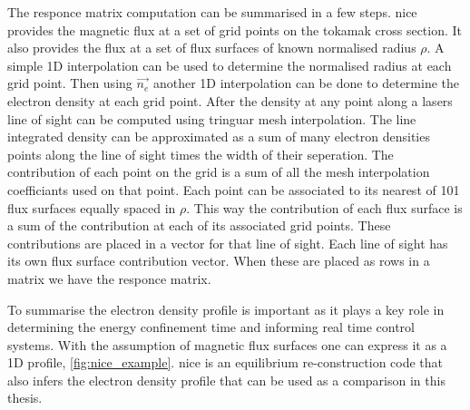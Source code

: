 The responce matrix computation can be summarised in a few steps. \Gls{nice} provides the magnetic flux at a set of grid points on the tokamak cross section. It also provides the flux at a set of flux surfaces of known normalised radius $\rho$. A simple 1D interpolation can be used to determine the normalised radius at each grid point. Then using $\Vec{n_e}$ another 1D interpolation can be done to determine the electron density at each grid point. After the density at any point along a lasers line of sight can be computed using tringuar mesh interpolation. The line integrated density can be approximated as a sum of many electron densities points along the line of sight times the width of their seperation. The contribution of each point on the grid is a sum of all the mesh interpolation coefficiants used on that point. Each point can be associated to its nearest of 101 flux surfaces equally spaced in $\rho$. This way the contribution of each flux surface is a sum of the contribution at each of its associated grid points. These contributions are placed in a vector for that line of sight. Each line of sight has its own flux surface contribution vector. When these are placed as rows in a matrix we have the responce matrix.




To summarise the electron density profile is important as it plays a key role in determining the energy confinement time and informing real time control systems. With the assumption of magnetic flux surfaces one can express it as a 1D profile, \ref{fig:nice_example}. \gls{nice} is an equilibrium re-construction code that also infers the electron density profile that can be used as a comparison in this thesis. 


